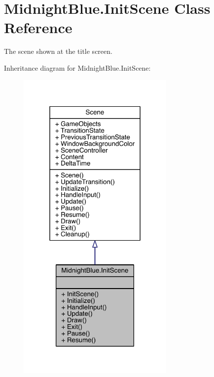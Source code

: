 \hypertarget{class_midnight_blue_1_1_init_scene}{}\section{Midnight\+Blue.\+Init\+Scene Class Reference}
\label{class_midnight_blue_1_1_init_scene}


The scene shown at the title screen.  




Inheritance diagram for Midnight\+Blue.\+Init\+Scene\+:
\nopagebreak
\begin{figure}[H]
\begin{center}
\leavevmode
\includegraphics[width=217pt]{class_midnight_blue_1_1_init_scene__inherit__graph}
\end{center}
\end{figure}


